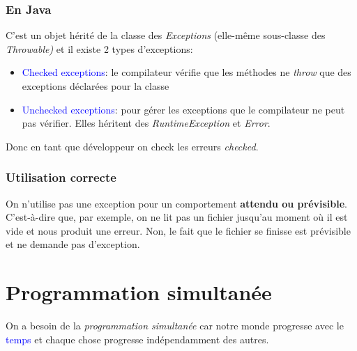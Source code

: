 \documentclass{report}
\begin{document}
\subsection{En Java}
C'est un objet hérité de la classe des \textit{Exceptions} (elle-même sous-classe des \textit{Throwable)} et il existe 2 types d'exceptions:
\begin{itemize}
\item \textcolor{blue}{Checked exceptions}: le compilateur vérifie que les méthodes ne \textit{throw} que des exceptions déclarées pour la classe
\item \textcolor{blue}{Unchecked exceptions}: pour gérer les exceptions que le compilateur ne peut pas vérifier. Elles héritent des \textit{RuntimeException} et \textit{Error}.
\end{itemize}
Donc en tant que développeur on check les erreurs \textit{checked}.

\subsection{Utilisation correcte}
On n'utilise pas une exception pour un comportement \textbf{attendu ou prévisible}. C'est-à-dire que, par exemple, on ne lit pas un fichier jusqu'au moment où il est vide et nous produit une erreur. Non, le fait que le fichier se finisse est prévisible et ne demande pas d'exception.


\chapter{Programmation simultanée}
On a besoin de la \textit{programmation simultanée} car notre monde progresse avec le \textcolor{blue}{temps} et chaque chose progresse indépendamment des autres.
\end{document}
